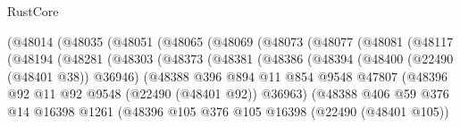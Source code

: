 \begin{lexlean}{RustCore}
\begin{coremodule}
                        (@48014
                          (@48035
                            (@48051
                              (@48065
                                (@48069
                                  (@48073
                                    (@48077
                                      (@48081
                                        (@48117
                                          (@48194
                                            (@48281
                                              (@48303
                                                (@48373
                                                  (@48381
                                                    (@48386
                                                      (@48394
                                                        (@48400 (@22490 (@48401 @38)) @36946)
                                                        (@48388
                                                          @396
                                                          @894
                                                          @11
                                                          @854
                                                          @9548
                                                          @47807
                                                          (@48396
                                                            @92
                                                            @11
                                                            @92
                                                            @9548
                                                            (@22490 (@48401 @92))
                                                            @36963)
                                                          (@48388
                                                            @406
                                                            @59
                                                            @376
                                                            @14
                                                            @16398
                                                            @1261
                                                            (@48396
                                                              @105
                                                              @376
                                                              @105
                                                              @16398
                                                              (@22490 (@48401 @105))

\end{coremodule}
\end{lexlean}
